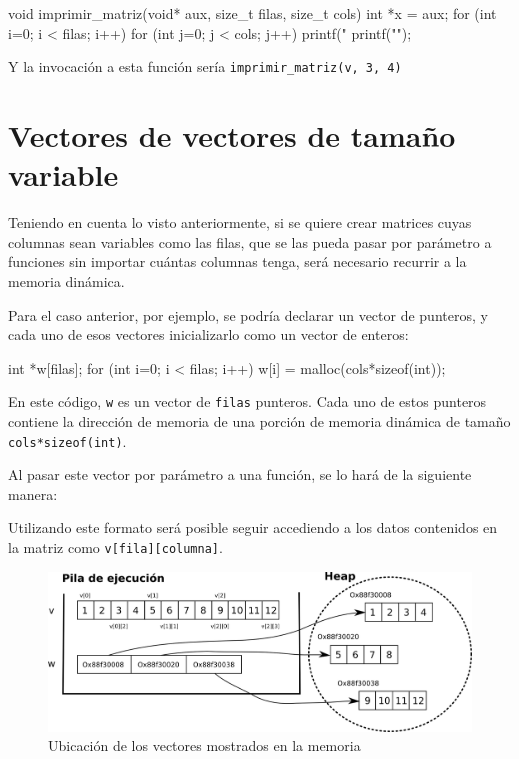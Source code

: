 \begin{codigo-c}
void imprimir_matriz(void* aux, size_t filas, size_t cols)
{
    int *x = aux;
    for (int i=0; i < filas; i++) {
        for (int j=0; j < cols; j++) {
            printf("%
        }
        printf("\n");
    }
}
\end{codigo-c}

Y la invocación a esta función sería \lstinline!imprimir_matriz(v, 3, 4)!

\section{Vectores de vectores de tamaño variable}

Teniendo en cuenta lo visto anteriormente, si se quiere crear matrices
cuyas columnas sean variables como las filas, que se las pueda pasar por
parámetro a funciones sin importar cuántas columnas tenga, será necesario
recurrir a la memoria dinámica.

Para el caso anterior, por ejemplo, se podría declarar un vector de
punteros, y cada uno de esos vectores inicializarlo como un vector de
enteros:

\begin{codigo-c-plano}
    int *w[filas];
    for (int i=0; i < filas; i++) {
        w[i] = malloc(cols*sizeof(int));
    }
\end{codigo-c-plano}

En este código, \lstinline!w! es un vector de \lstinline!filas! punteros.
Cada uno de estos punteros contiene la dirección de memoria de una porción
de memoria dinámica de tamaño \lstinline!cols*sizeof(int)!.

Al pasar este vector por parámetro a una función, se lo hará de la
siguiente manera:

\begin{codigo-c-plano}
void imprimir_matriz(int** v, size_t filas, size_t cols) {
\end{codigo-c-plano}

Utilizando este formato será posible seguir accediendo a los datos
contenidos en la matriz como \lstinline!v[fila][columna]!.

\begin{figure}[htb]
\centering
\includegraphics{imagenes/vectores-matrices}
\caption{Ubicación de los vectores mostrados en la memoria}
\end{figure}

